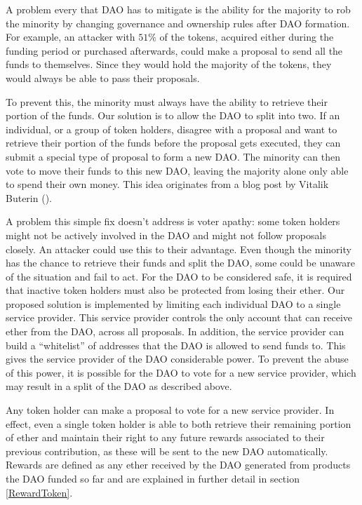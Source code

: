 \documentclass[9pt,oneside]{amsart}
\begin{document}
\begin{multicols}{2}
A problem every that DAO has to mitigate is the ability for the majority to rob the minority by changing governance and ownership rules after DAO formation. For example, an attacker with $51\%$ of the tokens, acquired either during the funding period or purchased afterwards, could make a proposal to send all the funds to themselves. Since they would hold the majority of the tokens, they would always be able to pass their proposals.

To prevent this, the minority must always have the ability to retrieve their portion of the funds. Our solution is to allow the DAO to split into two. If an individual, or a group of token holders, disagree with a proposal and want to retrieve their portion of the funds before the proposal gets executed, they can submit a special type of proposal to form a new DAO. The minority can then vote to move their funds to this new DAO, leaving the majority alone only able to spend their own money.
This idea originates from a blog post by Vitalik Buterin (\cite{Vitalik2015subjectivity}). 

A problem this simple fix doesn't address is voter apathy: some token holders might not be actively involved in the DAO and might not follow proposals closely. An attacker could use this to their advantage. Even though the minority has the chance to retrieve their funds and split the DAO, some could be unaware of the situation and fail to act. For the DAO to be considered safe, it is required that inactive token holders must also be protected from losing their ether. Our proposed solution is implemented by limiting each individual DAO to a single service provider. This service provider controls the only account that can receive ether from the DAO, across all proposals. In addition, the service provider can build a “whitelist” of addresses that the DAO is allowed to send funds to. This gives the service provider of the DAO considerable power. To prevent the abuse of this power, it is possible for the DAO to vote for a new service provider, which may result in a split of the DAO as described above. 

Any token holder can make a proposal to vote for a new service provider. In effect, even a single token holder is able to both retrieve their remaining portion of ether and maintain their right to any future rewards associated to their previous contribution, as these will be sent to the new DAO automatically. Rewards are defined as any ether received by the DAO generated from products the DAO funded so far and are explained in further detail in section \ref{RewardToken}.


\end{multicols}
\end{document}
